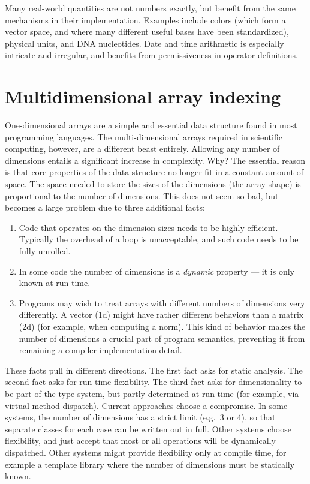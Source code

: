 Many real-world quantities are not numbers exactly, but benefit from the
same mechanisms in their implementation.
Examples include colors (which form a vector space, and where many different
useful bases have been standardized), physical units, and DNA nucleotides.
Date and time arithmetic is especially intricate and irregular, and
benefits from permissiveness in operator definitions.


\section{Multidimensional array indexing}
\label{sec:ndindexing}

One-dimensional arrays are a simple and essential data structure found in
most programming languages.
The multi-dimensional arrays required in scientific computing, however, are
a different beast entirely.
Allowing any number of dimensions entails a significant increase in complexity.
Why?
The essential reason is that core properties of the data structure no
longer fit in a constant amount of space.
The space needed to store the sizes of the dimensions (the array shape) is
proportional to the number of dimensions.
This does not seem so bad, but becomes a large problem due to three additional
facts:

\begin{enumerate}
\item Code that operates on the dimension sizes needs to be highly efficient.
Typically the overhead of a loop is unacceptable, and such code needs to be fully
unrolled.
\item In some code the number of dimensions is a \emph{dynamic} property --- it is
only known at run time.
\item Programs may wish to treat arrays with different numbers of dimensions very
differently.
A vector (1d) might have rather different behaviors than a matrix (2d)
(for example, when computing a norm).
This kind of behavior makes the number of dimensions a crucial part of program
semantics, preventing it from remaining a compiler implementation detail.
\end{enumerate}

These facts pull in different directions.
The first fact asks for static analysis.
The second fact asks for run time flexibility.
The third fact asks for dimensionality to be part of the type system, but
partly determined at run time (for example, via virtual method dispatch).
Current approaches choose a compromise.
In some systems, the number of dimensions has a strict limit (e.g.\ 3 or 4),
so that separate classes for each case can be written out in full.
Other systems choose flexibility, and just accept that most
or all operations will be dynamically dispatched.
Other systems might provide flexibility only at compile time, for example a
template library where the number of dimensions must be statically known.

